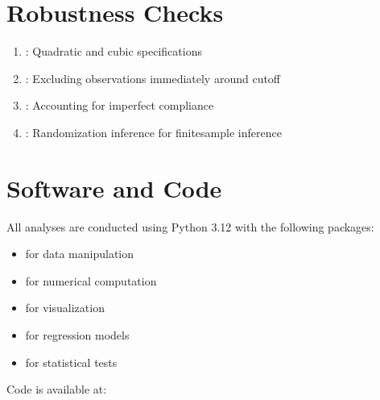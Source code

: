 \documentclass[letterpaper,10pt,english]{jupyterBook}
\begin{document}
\section{Robustness Checks}
\label{\detokenize{methodology:robustness-checks}}\begin{enumerate}
%
\item {} 
\sphinxAtStartPar
{}: Quadratic and cubic specifications

\item {} 
\sphinxAtStartPar
{}: Excluding observations immediately around cutoff

\item {} 
\sphinxAtStartPar
{}: Accounting for imperfect compliance

\item {} 
\sphinxAtStartPar
{}: Randomization inference for finite\sphinxhyphen{}sample inference

\end{enumerate}


\section{Software and Code}
\label{\detokenize{methodology:software-and-code}}
\sphinxAtStartPar
All analyses are conducted using Python 3.12 with the following packages:
\begin{itemize}
\item {} 
\sphinxAtStartPar
{} for data manipulation

\item {} 
\sphinxAtStartPar
{} for numerical computation

\item {} 
\sphinxAtStartPar
{} for visualization

\item {} 
\sphinxAtStartPar
{} for regression models

\item {} 
\sphinxAtStartPar
{} for statistical tests

\end{itemize}

\sphinxAtStartPar
Code is available at: 
\end{document}

